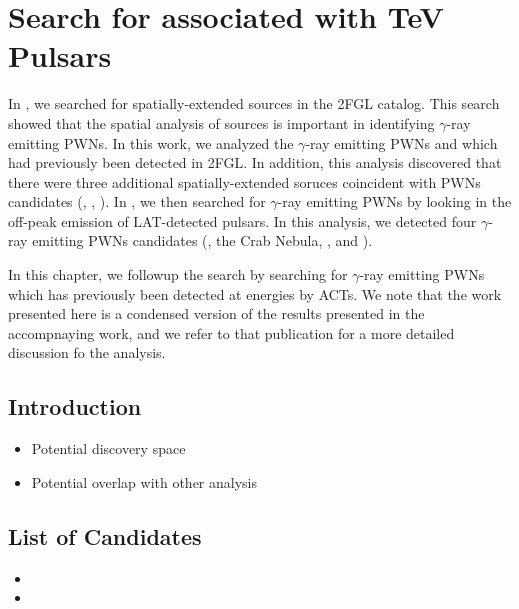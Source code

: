 \chapter{Search for  associated with TeV Pulsars}


In , we searched for spatially-extended sources
in the 2FGL catalog.  This search showed that the spatial analysis of
\fermi sources is important in identifying $\gamma$-ray emitting \acp{PWN}.
In this work, we analyzed the $\gamma$-ray emitting \acp{PWN} 
and \mshfifteenfiftytwo which had previously been detected in \ac{2FGL}.
In addition, this analysis discovered that there were three additional
spatially-extended \fermi soruces coincident with \acp{PWN} candidates
(, , ).
In , we then searched for $\gamma$-ray emitting \acp{PWN}
by looking in the off-peak emission of \ac{LAT}-detected
pulsars. In this analysis, we detected four $\gamma$-ray emitting \acp{PWN}
candidates (\velax, the Crab Nebula, \mshfifteenfiftytwo, and \threecfiftyeight).

In this chapter, we followup the search by searching for $\gamma$-ray
emitting \acp{PWN} which has previously been detected at \tev energies by
\acp{ACT}. We note that the work presented here is a condensed version
of the results presented in the accompnaying work, and we refer to that
publication for a more detailed discussion fo the analysis.

\section{Introduction}

\begin{itemize}
  \item Potential discovery space
  \item Potential overlap with other analysis
\end{itemize}

\section{List of Candidates}

\begin{itemize}
  \item
  \item
\end{itemize}

